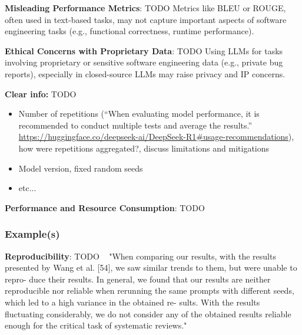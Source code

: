\textbf{Misleading Performance Metrics}: TODO
Metrics like BLEU or ROUGE, often used in text-based tasks, may not capture important aspects of software engineering tasks (e.g., functional correctness, runtime performance).

\textbf{Ethical Concerns with Proprietary Data}: TODO
Using LLMs for tasks involving proprietary or sensitive software engineering data (e.g., private bug reports), especially in closed-source LLMs may raise privacy and IP concerns.

\textbf{Clear info:} TODO
\begin{itemize}
  \item Number of repetitions (``When evaluating model performance, it is recommended to conduct multiple tests and average the results.'' \url{https://huggingface.co/deepseek-ai/DeepSeek-R1\#usage-recommendations}), how were repetitions aggregated?, discuss limitations and mitigations
  \item Model version, fixed random seeds
  \item etc...
\end{itemize}

\textbf{Performance and Resource Consumption}: TODO

\subsubsection{Example(s)}
\textbf{Reproducibility}: TODO
~\cite{10.1145/3673791.3698432} "When comparing our results, with the results presented by Wang et al. [54], we saw similar trends to them, but were unable to repro- duce their results. In general, we found that our results are neither reproducible nor reliable when rerunning the same prompts with different seeds, which led to a high variance in the obtained re- sults. With the results fluctuating considerably, we do not consider any of the obtained results reliable enough for the critical task of systematic reviews."

